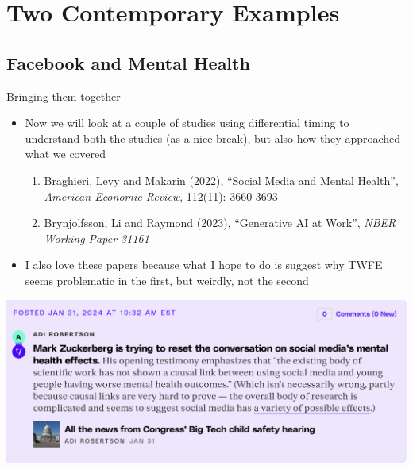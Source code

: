 \documentclass{beamer}
\begin{document}



\section{Two Contemporary Examples}

\subsection{Facebook and Mental Health}

\begin{frame}{Bringing them together}

\begin{itemize}

\item Now we will look at a couple of studies using differential timing to understand both the studies (as a nice break), but also how they approached what we covered
	\begin{enumerate}
	\item Braghieri, Levy and Makarin (2022), ``Social Media and Mental Health'', \emph{American Economic Review}, 112(11): 3660-3693
	\item Brynjolfsson, Li and Raymond (2023), ``Generative AI at Work'', \emph{NBER Working Paper 31161}
	\end{enumerate}
\item I also love these papers because what I hope to do is suggest why TWFE seems problematic in the first, but weirdly, not the second

\end{itemize}

\end{frame}


\begin{frame}
\begin{center}
\includegraphics[scale=0.35]{./lecture_includes/facebook_quote}
\end{center}
\end{frame}
\end{document}
